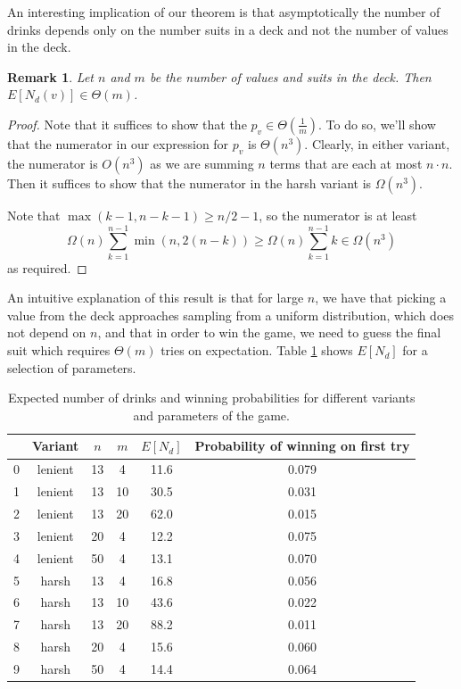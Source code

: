 \documentclass[12pt]{article}
\newtheorem{remark}{Remark}[section]
\theoremstyle{definition}
\begin{document}
An interesting implication of our theorem is that asymptotically the number of drinks depends only on the number suits in a deck and not the number of values in the deck. 

\begin{remark}
    Let $n$ and $m$ be the number of values and suits in the deck. Then $E[N_d(v)] \in \Theta(m)$. 
\end{remark}
\begin{proof}
    Note that it suffices to show that the $p_v \in \Theta(\frac{1}{m})$. To do so, we'll show that the numerator in our expression for $p_v$ is $\Theta(n^3)$. Clearly, in either variant, the numerator is $O(n^3)$ as we are summing $n$ terms that are each at most $n\cdot n$. Then it suffices to show that the numerator in the harsh variant is $\Omega(n^3)$. 

    Note that $\max(k-1, n-k-1) \geq n/2 -1$, so the numerator is at least 
    $$
    \Omega(n) \sum_{k=1}^{n-1}\min(n, 2(n-k)) \geq \Omega(n)\sum_{k=1}^{n-1}k \in \Omega(n^3)
    $$
    as required.

\end{proof}

An intuitive explanation of this result is that for large $n$, we have that picking a value from the deck approaches sampling from a uniform distribution, which does not depend on $n$, and that in order to win the game, we need to guess the final suit which requires $\Theta(m)$ tries on expectation. Table \ref{fig:ndtable} shows $E[N_d]$ for a selection of parameters.

\begin{table}[h]
\begin{center}
\begin{tabular}{@{}cccccc@{}}
\toprule
  & Variant         & $n$  & $m$  & $E[N_d]$          & Probability of winning on first try \\ \midrule
0 & lenient & 13 & 4  & 11.6& 0.079 \\
1 & lenient & 13 & 10 & 30.5& 0.031 \\
2 & lenient & 13 & 20 & 62.0& 0.015 \\
3 & lenient & 20 & 4  & 12.2& 0.075 \\
4 & lenient & 50 & 4  & 13.1& 0.070 \\
5 & harsh   & 13 & 4  & 16.8& 0.056 \\
6 & harsh   & 13 & 10 & 43.6& 0.022 \\
7 & harsh   & 13 & 20 & 88.2& 0.011 \\
8 & harsh   & 20 & 4  & 15.6& 0.060 \\
9 & harsh   & 50 & 4  & 14.4& 0.064 \\ \bottomrule
\end{tabular}
\caption{Expected number of drinks and winning probabilities for different variants and parameters of the game.}
\label{fig:ndtable}
\end{center}
\end{table}
\end{document}
